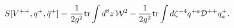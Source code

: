 \begin{equation}
\label{act}
S[V^{++},q^{+},\breve{q}^{+}]=\frac{1}{2g^2}{\rm
tr}\int d^8 z \,{\cal W}^2 - \frac{1}{2g^2}{\rm tr}\int
d\zeta^{-4} q^{+a}{\cal D}^{++}q^{+}_{a}.
\end{equation}

